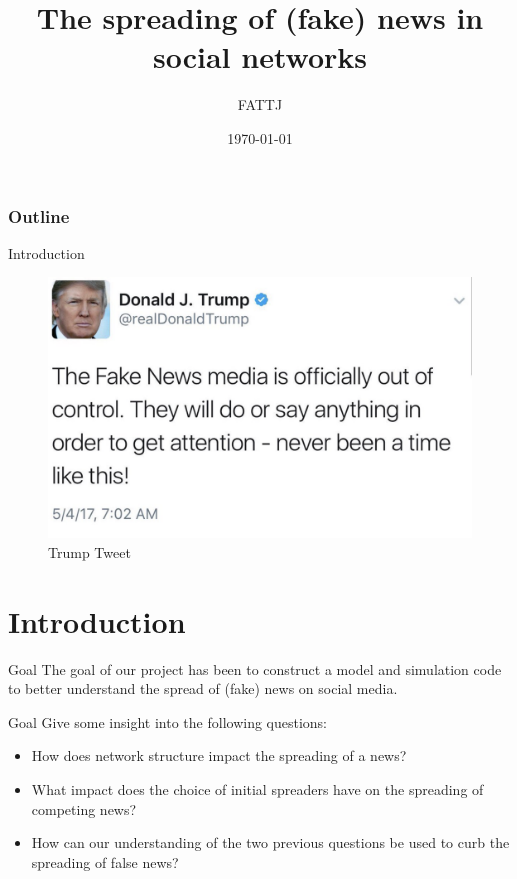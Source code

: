 \documentclass{beamer}
\title{The spreading of (fake) news in social networks}
\author{FATTJ}
\institute{ETH Zurich}
\date{\today}
\begin{document}
\titlepage

\begin{frame}
\frametitle{Outline}
\tableofcontents
\end{frame}

\begin{frame}{Introduction}
\begin{figure}
\includegraphics[scale=0.4]{images/TrumpFakeNews.png}
\caption{Trump Tweet}
\end{figure}
\end{frame}


\section{Introduction}

\begin{frame}{Goal}
The goal of our project has been to construct a model and simulation code to better understand the spread of (fake) news on social media.
\end{frame}

\begin{frame}{Goal}
Give some insight into the following questions:
\begin{itemize}
\item<1-> How does network structure impact the spreading of a news?
\item<2-> What impact does the choice of initial spreaders have on the spreading of
competing news?
\item<3-> How can our understanding of the two previous questions be used to curb
the spreading of false news?
\end{itemize}
\end{frame}
\end{document}
